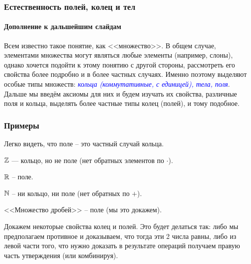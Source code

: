 
\begin{frame}
    \frametitle{\normalsize \textbf{Естественность полей, колец и тел}}
    \framesubtitle{Дополнение к дальшейшим слайдам}
    Всем известно такое понятие, как <<множество>>. В общем случае, элементами множества могут являться любые элементы (например, слоны), однако хочется подойти к этому понятию с другой стороны, рассмотреть его свойства более подробно и в более частных случаях. Именно поэтому выделяют особые типы множеств: \textcolor{blue}{\it кольца (коммутативные, с единицей), тела, поля}. Дальше мы введём аксиомы для них и будем изучать их свойства, различные поля и кольца, выделять более частные типы колец (полей), и тому подобное.

\end{frame}



\begin{frame}[t]
    \frametitle{\normalsize \bf Примеры}
    Легко видеть, что поле -- это частный случай кольца.
    
    $\mathbb{Z}$ --- кольцо, но не поле (нет обратных элементов по $\cdot$).
    
    $\mathbb{R}$ -- поле.

    $\mathbb{N}$ -- ни кольцо, ни поле (нет обратных по $+$).
     
    <<Множество дробей>> -- поле (мы это докажем).


    Докажем некоторые свойства колец и полей. Это будет делаться так: либо мы предполагаем противное и доказываем, что тогда эти 2 числа равны, либо из левой части того, что нужно доказать в результате операций получаем правую часть утверждения (или комбинируя).
\end{frame}



